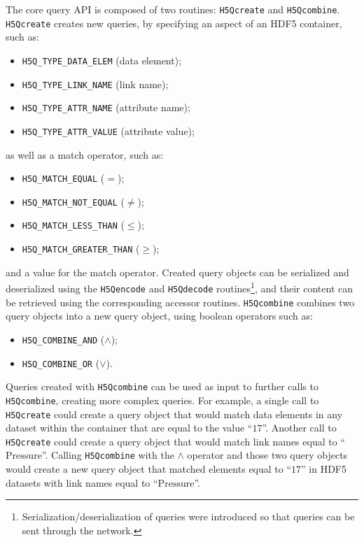 The core query API is composed of
two routines: \texttt{H5Qcreate} and \texttt{H5Qcombine}. \texttt{H5Qcreate}
creates new queries, by specifying an aspect of an HDF5 container, such as:
\begin{itemize}
\item \texttt{H5Q\_TYPE\_DATA\_ELEM} (data element);
\item \texttt{H5Q\_TYPE\_LINK\_NAME} (link name);
\item \texttt{H5Q\_TYPE\_ATTR\_NAME} (attribute name);
\item \texttt{H5Q\_TYPE\_ATTR\_VALUE} (attribute value);
\end{itemize}
as well as a match operator, such as:
\begin{itemize}
\item \texttt{H5Q\_MATCH\_EQUAL} ($=$);
\item \texttt{H5Q\_MATCH\_NOT\_EQUAL} ($\neq$);
\item \texttt{H5Q\_MATCH\_LESS\_THAN} ($\leq$);
\item \texttt{H5Q\_MATCH\_GREATER\_THAN} ($\geq$);
\end{itemize}
and a value for the match operator.
Created query objects can be serialized and deserialized using the \texttt{H5Qencode}
and \texttt{H5Qdecode} routines\footnote{Serialization/deserialization of queries
were introduced so that queries can be sent through the network.}, and their
content can be retrieved using the corresponding accessor routines.
\texttt{H5Qcombine} combines two query objects into a
new query object, using boolean operators such as:
\begin{itemize}
\item \texttt{H5Q\_COMBINE\_AND} ($\mathrm{\land}$);
\item \texttt{H5Q\_COMBINE\_OR} ($\mathrm{\lor}$).
\end{itemize}
Queries created with \texttt{H5Qcombine} can be used as input to further
calls to \texttt{H5Qcombine}, creating more complex queries.
For example, a single call to \texttt{H5Qcreate} could create a query object
that would match data elements in any dataset within the container that are
equal to the value ``$\mathrm{17}$''. Another call to \texttt{H5Qcreate} could create a
query object that would match link names equal to ``$\mathrm{Pressure}$''.
Calling \texttt{H5Qcombine} with the $\mathrm{\land}$ operator and those two query
objects would create a new query object that matched elements equal to ``$\mathrm{17}$''
in HDF5 datasets with link names equal to ``$\mathrm{Pressure}$''.
